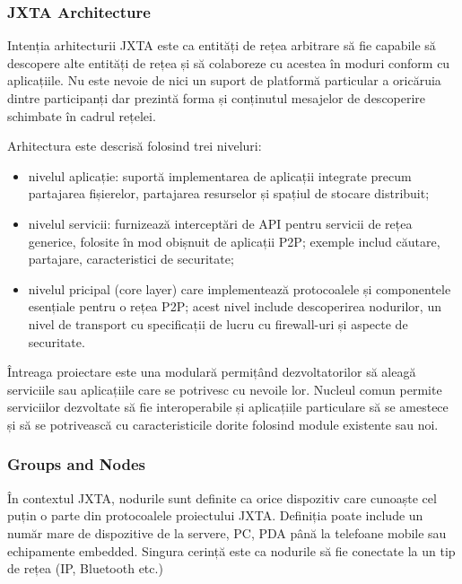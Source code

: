\subsubsection{JXTA Architecture}

Intenția arhitecturii JXTA este ca entități de rețea arbitrare să fie capabile
să descopere alte entități de rețea și să colaboreze cu acestea în moduri
conform cu aplicațiile. Nu este nevoie de nici un suport de platformă
particular a oricăruia dintre participanți dar prezintă forma și conținutul
mesajelor de descoperire schimbate în cadrul rețelei.

Arhitectura este descrisă folosind trei niveluri:

\begin{itemize}
  \item nivelul aplicație: suportă implementarea de aplicații integrate precum
  partajarea fișierelor, partajarea resurselor și spațiul de stocare
  distribuit;
  \item nivelul servicii: furnizează interceptări de API pentru servicii de
  rețea generice, folosite în mod obișnuit de aplicații P2P; exemple includ
  căutare, partajare, caracteristici de securitate;
  \item nivelul pricipal (core layer) care implementează protocoalele și
  componentele esențiale pentru o rețea P2P; acest nivel include descoperirea
  nodurilor, un nivel de transport cu specificații de lucru cu firewall-uri și
  aspecte de securitate.
\end{itemize}

Întreaga proiectare este una modulară permițând dezvoltatorilor să aleagă
serviciile sau aplicațiile care se potrivesc cu nevoile lor. Nucleul comun
permite serviciilor dezvoltate să fie interoperabile și aplicațiile
particulare să se amestece și să se potrivească cu caracteristicile dorite
folosind module existente sau noi.

\subsubsection{Groups and Nodes}

În contextul JXTA, nodurile sunt definite ca orice dispozitiv care cunoaște
cel puțin o parte din protocoalele proiectului JXTA. Definiția poate include
un număr mare de dispozitive de la servere, PC, PDA până la telefoane mobile
sau echipamente embedded. Singura cerință este ca nodurile să fie conectate la
un tip de rețea (IP, Bluetooth etc.)

